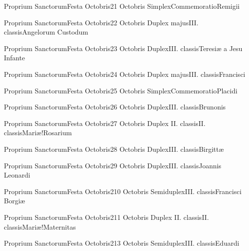 \documentclass[invitatoriale-romanum.tex]{subfiles}
\begin{document}

	{Proprium Sanctorum}{Festa Octobris}{2}{1 Octobris}
	{Simplex}{Commemoratio}{Remigii}
	{}
	{\invitferia}

	{Proprium Sanctorum}{Festa Octobris}{2}{2 Octobris}
	{Duplex majus}{III. classis}{Angelorum Custodum}
	{}
	{}

	{Proprium Sanctorum}{Festa Octobris}{2}{3 Octobris}
	{Duplex}{III. classis}{Teresiæ a Jesu Infante}
	{}
	{}

	{Proprium Sanctorum}{Festa Octobris}{2}{4 Octobris}
	{Duplex majus}{III. classis}{Francisci}
	{}
	{}

	{Proprium Sanctorum}{Festa Octobris}{2}{5 Octobris}
	{Simplex}{Commemoratio}{Placidi}
	{}
	{\invitferia}

	{Proprium Sanctorum}{Festa Octobris}{2}{6 Octobris}
	{Duplex}{III. classis}{Brunonis}
	{}
	{}

	{Proprium Sanctorum}{Festa Octobris}{2}{7 Octobris}
	{Duplex II. classis}{II. classis}{Mariæ!Rosarium}
	{}
	{}

	{Proprium Sanctorum}{Festa Octobris}{2}{8 Octobris}
	{Duplex}{III. classis}{Birgittæ}
	{}
	{}

	{Proprium Sanctorum}{Festa Octobris}{2}{9 Octobris}
	{Duplex}{III. classis}{Joannis Leonardi}
	{}
	{}

	{Proprium Sanctorum}{Festa Octobris}{2}{10 Octobris}
	{Semiduplex}{III. classis}{Francisci Borgiæ}
	{}
	{}

	{Proprium Sanctorum}{Festa Octobris}{2}{11 Octobris}
	{Duplex II. classis}{II. classis}{Mariæ!Maternitas}
	{}
	{}

	{Proprium Sanctorum}{Festa Octobris}{2}{13 Octobris}
	{Semiduplex}{III. classis}{Eduardi}
	{}
	{}
\end{document}
